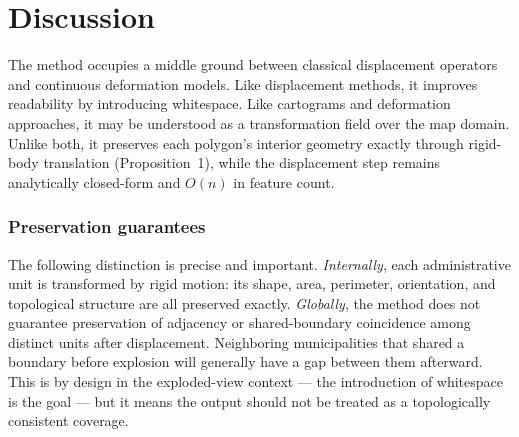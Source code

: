 \documentclass[12pt, a4paper]{article}
\numberwithin{equation}{section}
\begin{document}
\section{Discussion}
\label{sec:discussion}

The method occupies a middle ground between classical displacement operators and continuous deformation models. Like displacement methods, it improves readability by introducing whitespace. Like cartograms and deformation approaches, it may be understood as a transformation field over the map domain. Unlike both, it preserves each polygon's interior geometry exactly through rigid-body translation (Proposition~1), while the displacement step remains analytically closed-form and $O(n)$ in feature count.

\subsubsection*{Preservation guarantees}

The following distinction is precise and important. \emph{Internally}, each administrative unit is transformed by rigid motion: its shape, area, perimeter, orientation, and topological structure are all preserved exactly. \emph{Globally}, the method does not guarantee preservation of adjacency or shared-boundary coincidence among distinct units after displacement. Neighboring municipalities that shared a boundary before explosion will generally have a gap between them afterward. This is by design in the exploded-view context --- the introduction of whitespace is the goal --- but it means the output should not be treated as a topologically consistent coverage.
\end{document}
